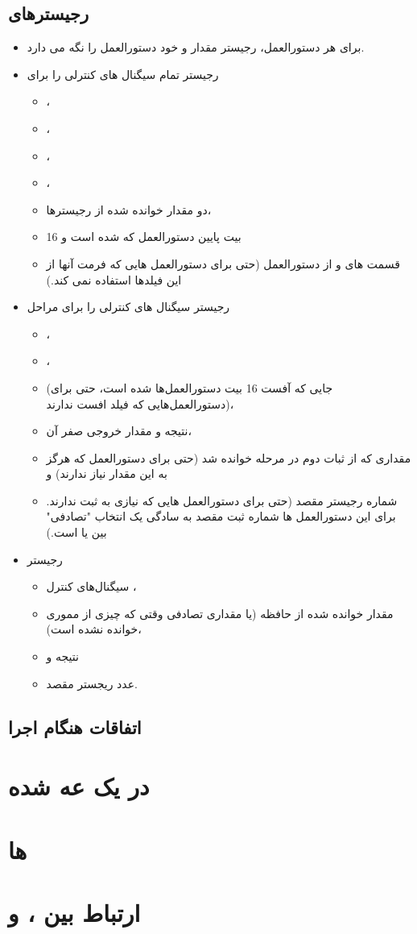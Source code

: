 \documentclass[11pt, dvipsnames, svgnames, x11names]{article}
\begin{document}
\subsection{رجیستر‌های }
\begin{itemize}
\item 
برای هر دستورالعمل، رجیستر
مقدار
و خود دستورالعمل را نگه می دارد.

\item 
رجیستر
تمام سیگنال های کنترلی را برای
\begin{itemize}
\item {}،
\item {}،
\item {}،
\item {}،
\item دو مقدار خوانده شده از رجیستر‌ها،
\item 
16 بیت پایین دستورالعمل که 
شده است و
\item 
قسمت های
و
از دستورالعمل (حتی برای دستورالعمل هایی که فرمت آنها از این فیلدها استفاده نمی کند.)
\end{itemize}

\item 
رجیستر 
سیگنال های کنترلی را برای مراحل
\begin{itemize}
\item {}،
\item {}، 
\item 
{}
(جایی که آفست 16 بیت دستورالعمل‌ها 
شده است، حتی برای دستورالعمل‌هایی که فیلد افست ندارند)،
\item 
نتیجه  و مقدار خروجی صفر آن،
\item 
مقداری که از ثبات دوم در مرحله 
خوانده شد (حتی برای دستورالعمل که هرگز به این مقدار نیاز ندارند) و
\item 
شماره رجیستر مقصد (حتی برای دستورالعمل هایی که نیازی به ثبت ندارند. برای این دستورالعمل ها شماره ثبت مقصد به سادگی یک انتخاب "تصادفی" بین
یا
است.)
\end{itemize} 

\item 
رجیستر 
\begin{itemize}
\item 
سیگنال‌های کنترل ،
\item 
مقدار خوانده شده از حافظه (یا مقداری تصادفی وقتی که چیزی از مموری خوانده نشده است)،
\item 
نتیجه  و
\item 
عدد ریجستر مقصد.
\end{itemize}
\end{itemize}

\subsection{اتفاقات هنگام اجرا}
\section{ در یک  عه  شده}
\section{ها}
\section{ارتباط بین ،  و }
\end{document}
